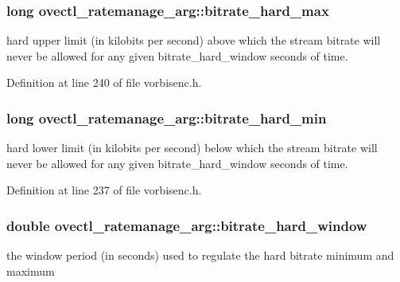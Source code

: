 \subsubsection[{\texorpdfstring{bitrate\+\_\+hard\+\_\+max}{bitrate_hard_max}}]{\setlength{\rightskip}{0pt plus 5cm}long ovectl\+\_\+ratemanage\+\_\+arg\+::bitrate\+\_\+hard\+\_\+max}\hypertarget{structovectl__ratemanage__arg_a3620024b5a9e4b4df6d20deb6c125c92}{}\label{structovectl__ratemanage__arg_a3620024b5a9e4b4df6d20deb6c125c92}
hard upper limit (in kilobits per second) above which the stream bitrate will never be allowed for any given bitrate\+\_\+hard\+\_\+window seconds of time. 

Definition at line 240 of file vorbisenc.\+h.

\subsubsection[{\texorpdfstring{bitrate\+\_\+hard\+\_\+min}{bitrate_hard_min}}]{\setlength{\rightskip}{0pt plus 5cm}long ovectl\+\_\+ratemanage\+\_\+arg\+::bitrate\+\_\+hard\+\_\+min}\hypertarget{structovectl__ratemanage__arg_a449d3ea8d0645742af859dd17b41fbfb}{}\label{structovectl__ratemanage__arg_a449d3ea8d0645742af859dd17b41fbfb}
hard lower limit (in kilobits per second) below which the stream bitrate will never be allowed for any given bitrate\+\_\+hard\+\_\+window seconds of time. 

Definition at line 237 of file vorbisenc.\+h.

\subsubsection[{\texorpdfstring{bitrate\+\_\+hard\+\_\+window}{bitrate_hard_window}}]{\setlength{\rightskip}{0pt plus 5cm}double ovectl\+\_\+ratemanage\+\_\+arg\+::bitrate\+\_\+hard\+\_\+window}\hypertarget{structovectl__ratemanage__arg_a68caf36fc02a52199705fa331d118446}{}\label{structovectl__ratemanage__arg_a68caf36fc02a52199705fa331d118446}
the window period (in seconds) used to regulate the hard bitrate minimum and maximum 

